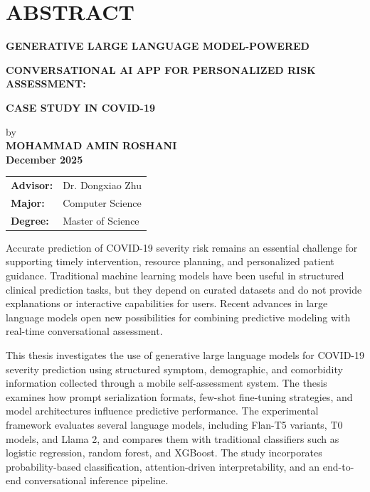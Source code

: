 \section*{ABSTRACT}

\centerline{\bf GENERATIVE LARGE LANGUAGE MODEL-POWERED}
\vspace{-0.4cm}
\centerline{\bf CONVERSATIONAL AI APP FOR PERSONALIZED RISK ASSESSMENT:}
\vspace{-0.4cm}
\centerline{\bf CASE STUDY IN COVID-19}

{\setlength\baselineskip{0.3in}
	\begin{center}
	by\\
	\medskip
	{\bf MOHAMMAD AMIN ROSHANI}\\
	\medskip
	{\bf December 2025}\\
	\end{center}
	\Vspc
	\begin{tabular}{ll}
		{\bf Advisor:} & Dr. Dongxiao Zhu \\
		{\bf Major:} & Computer Science \\
		{\bf Degree:} & Master of Science
	\end{tabular}
}

\bigskip \bigskip

Accurate prediction of COVID-19 severity risk remains an essential challenge for supporting timely intervention, resource planning, and personalized patient guidance. Traditional machine learning models have been useful in structured clinical prediction tasks, but they depend on curated datasets and do not provide explanations or interactive capabilities for users. Recent advances in large language models open new possibilities for combining predictive modeling with real-time conversational assessment.

This thesis investigates the use of generative large language models for COVID-19 severity prediction using structured symptom, demographic, and comorbidity information collected through a mobile self-assessment system. The thesis examines how prompt serialization formats, few-shot fine-tuning strategies, and model architectures influence predictive performance. The experimental framework evaluates several language models, including Flan-T5 variants, T0 models, and Llama 2, and compares them with traditional classifiers such as logistic regression, random forest, and XGBoost. The study incorporates probability-based classification, attention-driven interpretability, and an end-to-end conversational inference pipeline.

